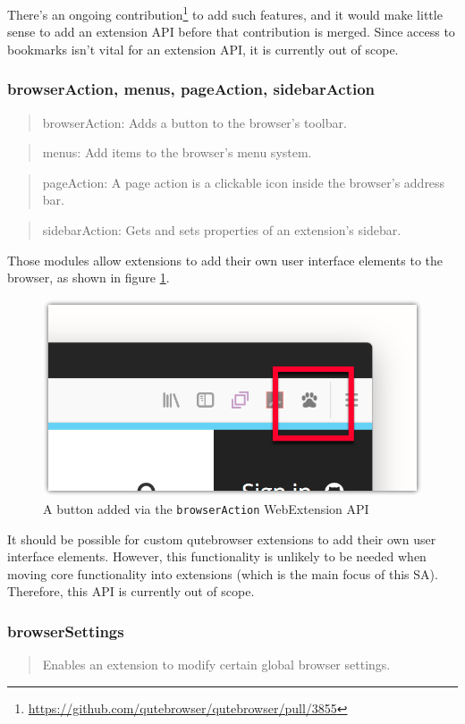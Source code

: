 \documentclass[a4paper,parskip=full]{scrreprt}
\begin{document}
There's an ongoing
contribution\footnote{\url{https://github.com/qutebrowser/qutebrowser/pull/3855}}
to add such features, and it would make little sense to add an extension API before
that contribution is merged. Since access to bookmarks isn't vital for an extension
API, it is currently out of scope.

\subsubsection{browserAction, menus, pageAction, sidebarAction}
\begin{quote}
browserAction: Adds a button to the browser's toolbar.
\end{quote}
\begin{quote}
menus: Add items to the browser's menu system.
\end{quote}
\begin{quote}
pageAction: A page action is a clickable icon inside the browser's address bar.
\end{quote}
\begin{quote}
sidebarAction: Gets and sets properties of an extension's sidebar.
\end{quote}

Those modules allow extensions to add their own user interface elements to the
browser, as shown in figure \ref{img:browser-action}.

\begin{figure}[h]
  \centering
  \includegraphics[width=0.5\linewidth]{img/browser-action.png}
  \caption{A button added via the \texttt{browserAction} WebExtension API}
  \label{img:browser-action}
\end{figure}

It should be possible for custom qutebrowser extensions to add their own user
interface elements. However, this functionality is unlikely to be needed
when moving core functionality into extensions (which is the main focus of this
SA). Therefore, this API is currently out of scope.

\subsubsection{browserSettings}
\begin{quote}
Enables an extension to modify certain global browser settings.
\end{quote}
\end{document}
